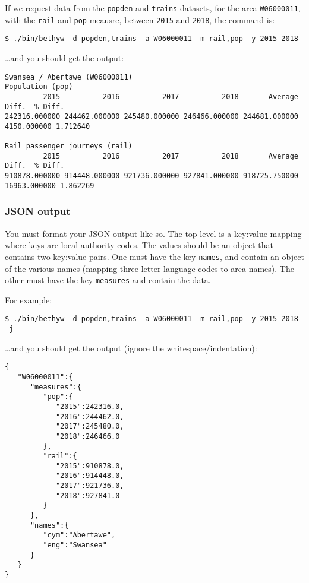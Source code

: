 \documentclass[a4paper]{article}
\begin{document}
If we request data from the \texttt{popden} and \texttt{trains} datasets, for the area \texttt{W06000011}, with the \texttt{rail} and \texttt{pop} meausre, between \texttt{2015} and \texttt{2018}, the command is:
\begin{Verbatim}
$ ./bin/bethyw -d popden,trains -a W06000011 -m rail,pop -y 2015-2018
\end{Verbatim}
\ldots and you should get the output:
\begin{lstlisting}[backgroundcolor = \color{lightgray}]
Swansea / Abertawe (W06000011)
Population (pop) 
         2015          2016          2017          2018       Average       Diff.  % Diff. 
242316.000000 244462.000000 245480.000000 246466.000000 244681.000000 4150.000000 1.712640 

Rail passenger journeys (rail) 
         2015          2016          2017          2018       Average        Diff.  % Diff. 
910878.000000 914448.000000 921736.000000 927841.000000 918725.750000 16963.000000 1.862269 
\end{lstlisting}


\subsubsection*{JSON output}\label{sec:cwk output json}
You must format your JSON output like so. The top level is a key:value mapping where keys are local authority codes. The values should be an object that contains two key:value pairs. One must have the key \texttt{names}, and contain an object of the various names (mapping three-letter language codes to area names). The other must have the key \texttt{measures} and contain the data.

For example:
\begin{Verbatim}
$ ./bin/bethyw -d popden,trains -a W06000011 -m rail,pop -y 2015-2018 -j
\end{Verbatim}
\ldots and you should get the output (ignore the whitespace/indentation):
\begin{lstlisting}[backgroundcolor = \color{lightgray}]
{
   "W06000011":{
      "measures":{
         "pop":{
            "2015":242316.0,
            "2016":244462.0,
            "2017":245480.0,
            "2018":246466.0
         },
         "rail":{
            "2015":910878.0,
            "2016":914448.0,
            "2017":921736.0,
            "2018":927841.0
         }
      },
      "names":{
         "cym":"Abertawe",
         "eng":"Swansea"
      }
   }
}
\end{lstlisting}
\end{document}
